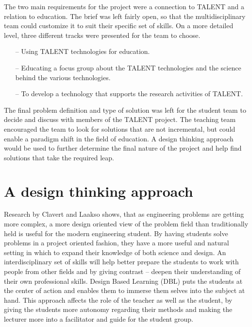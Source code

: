 \documentclass[english,12pt,a4paper,dvips]{article}
\begin{document}
The two main requirements for the project were a connection to TALENT and a relation to education. The brief was left fairly open, so that the multidisciplinary team could customize it to suit their specific set of skills. On a more detailed level, three different tracks were presented for the team to choose.

\begin{itemize}
\item[--]Using TALENT technologies for education.
\item[--]Educating a focus group about the TALENT technologies and the science behind the various technologies.
\item[--]To develop a technology that supports the research activities of TALENT.
\end{itemize}

The final problem definition and type of solution was left for the student team to decide and discuss with members of the TALENT project. The teaching team encouraged the team to look for solutions that are not incremental, but could enable a paradigm shift in the field of education. A design thinking approach would be used to further determine the final nature of the project and help find solutions that take the required leap.


\clearpage

\section{A design thinking approach}

Research by Clavert and Laakso \cite{Clavert} shows, that as engineering problems are getting more complex, a more design oriented view of the problem field than traditionally held is useful for the modern engineering student. By having students solve problems in a project oriented fashion, they have a more useful and natural setting in which to expand their knowledge of both science and design. An interdisciplinary set of skills will help better prepare the students to work with people from other fields and by giving contrast -- deepen their understanding of their own professional skills. Design Based Learning (DBL) puts the students at the center of action and enables them to immerse them selves into the subject at hand. This approach affects the role of the teacher as well as the student, by giving the students more autonomy regarding their methods and making the lecturer more into a facilitator and guide for the student group.
\end{document}
